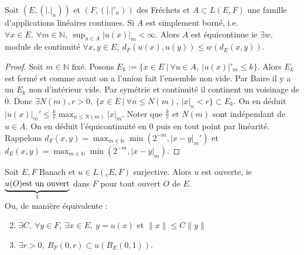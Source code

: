 \begin{theoreme}
    Soit $(E,(|.|_n))$ et $(F,(|.|'_n))$ des Fréchets et $A\subset L(E,F)$ une famille d'applications linéaires continues. Si $A$ est simplement borné, i.e. $\forall x\in E,\ \forall m\in \mathbb{N} ,\ \sup_{u\in A}|u(x)|_m<\infty . $ Alors $A$ est équicontinue ie $\exists w,$ module de continuité $\forall x,y\in E,\ d_F(u(x),u(y))\le w(d_E(x,y)). $
\end{theoreme}
\begin{proof}
    Soit $m\in \mathbb{N} $ fixé. Posons $E_k:=\{x\in E\ |\ \forall u\in A,\ |u(x)|'_m\le k \}  $. Alors $E_k$ est fermé et comme avant on a l'union fait l'ensemble non vide. Par Baire il y a un $E_k$ non d'intérieur vide. Par symétrie et continuité il continent un voisinage de 0. Donc $\exists N(m), r>0,\ \{x\in E\ |\ \forall n\le N(m),\ |x|_n<r \} \subset E_k.$ On en déduit $|u(x)|_m'\le \frac{k}{r}\max_{n\le N(m)}|x|_m.$ Noter que $\frac{k}{r}$ et $N(m)$ sont indépendant de $u\in A.$ On en déduit l'équicontinuité en 0 puis en tout point par linéarité. Rappelons $d_F(x,y)=\max_{m\in \mathbb{N} }\min(2^{-m},|x-y|_m')$ et $d_E(x,y)=\max_{m\in \mathbb{N} }\min(2^{-m},|x-y|_m)$.
\end{proof}
\begin{theoreme}
    Soit $E,F$ Banach et $u\in L(_cE,F)$ surjective. Alors $u$ est ouverte, ie $\underbrace{u(O) \text{est un ouvert}}_{\mathclap{\text{1}}}$ dans $F$ pour tout ouvert $O$ de $E$.\\
    Ou, de manière équivalente :
    \begin{enumerate} \setcounter{enumi}{1}
        \item $\exists C,\ \forall y\in F,\ \exists x\in E,\ y=u(x) $ et $\|x\|\le C\|y\|$
        \item $\exists r>0,\ B_F(0,r)\subset u(B_E(0,1))$.
    \end{enumerate}
\end{theoreme}
